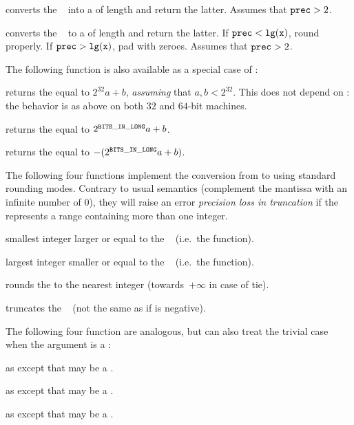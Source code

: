  converts the ~ into a
 of length  and return the latter. Assumes that
${\tt prec} > 2$.

 converts the ~ to a
 of length  and return the latter. If
${\tt prec} < {\tt lg(x)}$, round properly. If ${\tt prec} > {\tt lg(x)}$,
pad with zeroes. Assumes that ${\tt prec} > 2$.

\noindent The following function is also available as a special case of
:

 returns the  equal to $2^{32} a +
b$, \emph{assuming} that $a,b < 2^{32}$. This does not depend on
: the behavior is as above on both $32$ and $64$-bit
machines.

 returns the  equal to
$2^{{\tt BITS\_IN\_LONG}} a + b$.

 returns the  equal to
$-(2^{{\tt BITS\_IN\_LONG}} a + b)$.

The following four functions implement the conversion from  to
 using standard rounding modes. Contrary to usual semantics
(complement the mantissa with an infinite number of 0), they will raise an
error \emph{precision loss in truncation} if the  represents a
range containing more than one integer.

 smallest integer larger or equal
to the ~ (i.e.~the  function).

 largest integer smaller or equal to the
~ (i.e.~the  function).

 rounds the   to the nearest integer
(towards~$+\infty$ in case of tie).

 truncates the ~ (not the same as
 if  is negative).

The following four function are analogous, but can also treat the trivial
case when the argument is a :

as  except that  may be a .

as  except that  may be a .

as  except that  may be a .

